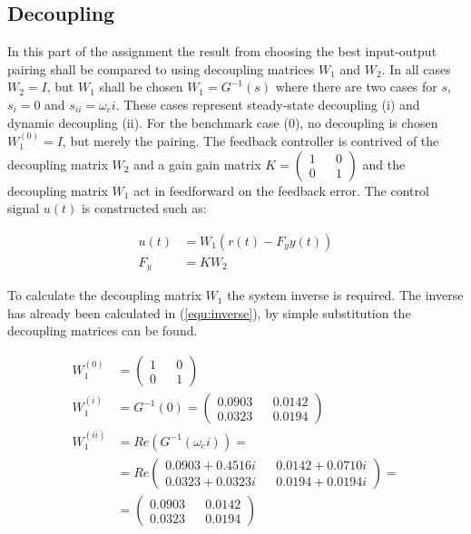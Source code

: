 \documentclass[a4paper, titlepage]{article}
\begin{document}
\subsection{Decoupling}
In this part of the assignment the result from choosing the best input-output pairing shall be compared to using decoupling matrices $W_1$ and $W_2$.
In all cases $W_2 = I$, but $W_1$ shall be chosen $W_1 = G^{-1}(s)$ where there are two cases for $s$, $s_i = 0$ and $s_{ii}=\omega_ci$.
These cases represent steady-state decoupling (i) and dynamic decoupling (ii).
For the benchmark case (0), no decoupling is chosen $W^{(0)}_1 = I$, but merely the pairing.
The feedback controller is contrived of the decoupling matrix $W_2$ and a gain gain matrix $K = \begin{pmatrix} 1 && 0 \\ 0 && 1 \end{pmatrix}$ and the decoupling matrix $W_1$ act in feedforward on the feedback error.
The control signal $u(t)$ is constructed such as:

\begin{equation}
\begin{split}
u(t) &= W_1(r(t) - F_yy(t)) \\
F_y &= KW_2
\end{split}
\label{equ:fbControl}
\end{equation}

To calculate the decoupling matrix $W_1$ the system inverse is required.
The inverse has already been calculated in (\ref{equ:inverse}), by simple substitution the decoupling matrices can be found.

\begin{equation}
\begin{split}
W^{(0)}_1 &= 
\begin{pmatrix}
1 && 0 \\ 0 && 1
\end{pmatrix} \\
W^{(i)}_1 &= G^{-1}(0) = 
\begin{pmatrix}
0.0903 && 0.0142 \\ 0.0323 && 0.0194
\end{pmatrix} \\
W^{(ii)}_1 &= Re(G^{-1}(\omega_ci)) = \\
&=
Re\begin{pmatrix}
0.0903 + 0.4516i && 0.0142 + 0.0710i \\
0.0323 + 0.0323i && 0.0194 + 0.0194i
\end{pmatrix} = \\
&= 
\begin{pmatrix}
0.0903 && 0.0142 \\ 0.0323 && 0.0194
\end{pmatrix}
\end{split}
\label{equ:decoupling}
\end{equation}
\end{document}
